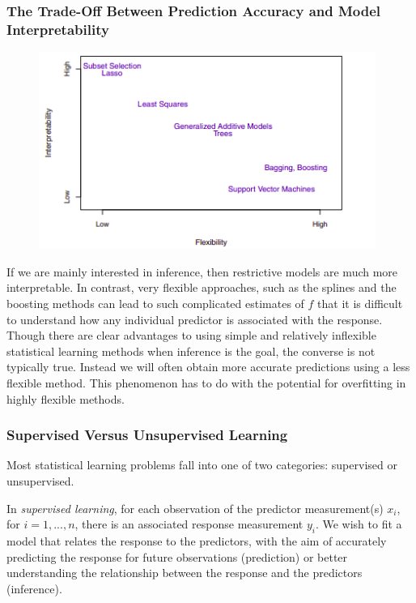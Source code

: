 \documentclass{article}
\numberwithin{equation}{section}
\begin{document}
\subsubsection{The Trade-Off Between Prediction Accuracy and Model Interpretability}

\begin{figure}[H]
    \centering
    \includegraphics[width=11cm]{isl-figure-1.png}
\end{figure}


If we are mainly interested in inference, then restrictive models are much more interpretable.  In contrast, very flexible approaches, such as the splines and the boosting methods can lead to such complicated estimates of $f$ that it is difficult to understand how any individual predictor is associated with the response. 
Though there are clear advantages to using simple and relatively inflexible statistical learning methods when inference is the goal, the converse is not typically true. Instead we will often obtain more accurate predictions using a less flexible method. This phenomenon has to do with the potential for overfitting in highly flexible
methods.

\subsubsection{Supervised Versus Unsupervised Learning}
Most statistical learning problems fall into one of two categories: supervised or unsupervised.

In \textit{supervised learning}, for each observation of the predictor measurement(s) $x_i$, for $ i = 1,...,n$, there is an associated response measurement $y_i$. We wish to fit a model that relates the response to the predictors, with the aim of accurately predicting the response for future
observations (prediction) or better understanding the relationship between the response and the predictors (inference).
\end{document}
